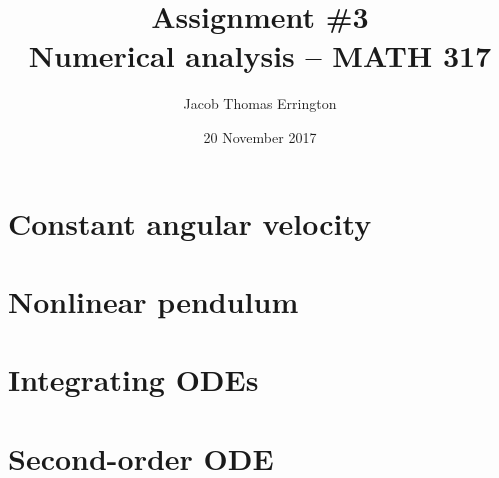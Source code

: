 \documentclass[11pt,letterpaper]{article}
\author{Jacob Thomas Errington}
\title{Assignment \#3\\Numerical analysis -- MATH 317}
\date{20 November 2017}
\begin{document}
\maketitle

\section{Constant angular velocity}

\section{Nonlinear pendulum}

\section{Integrating ODEs}

\section{Second-order ODE}
\end{document}
